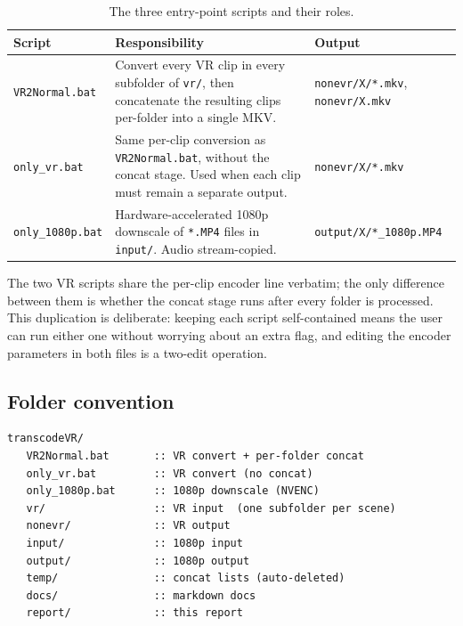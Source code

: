 \documentclass[11pt,a4paper]{article}
\begin{document}
\begin{table}[h]
\centering
\renewcommand{\arraystretch}{1.25}
\begin{tabularx}{\linewidth}{lXl}
\toprule
\textbf{Script} & \textbf{Responsibility} & \textbf{Output} \\
\midrule
\texttt{VR2Normal.bat} & Convert every VR clip in every subfolder of
\texttt{vr/}, then concatenate the resulting clips per-folder into a
single MKV. & \texttt{nonevr/X/*.mkv}, \texttt{nonevr/X.mkv} \\
\texttt{only\_vr.bat} & Same per-clip conversion as
\texttt{VR2Normal.bat}, without the concat stage. Used when each clip
must remain a separate output. & \texttt{nonevr/X/*.mkv} \\
\texttt{only\_1080p.bat} & Hardware-accelerated 1080p downscale of
\texttt{*.MP4} files in \texttt{input/}. Audio stream-copied. &
\texttt{output/X/*\_1080p.MP4} \\
\bottomrule
\end{tabularx}
\caption{The three entry-point scripts and their roles.}
\end{table}

The two VR scripts share the per-clip encoder line verbatim; the only
difference between them is whether the concat stage runs after every
folder is processed. This duplication is deliberate: keeping each
script self-contained means the user can run either one without
worrying about an extra flag, and editing the encoder parameters in
both files is a two-edit operation.

\subsection{Folder convention}

\begin{lstlisting}[language=batch, caption={Project layout. Empty
content directories ship with the repository as conventions; only
\texttt{*.bat}, \texttt{LICENSE}, \texttt{README.md}, and the
\texttt{docs/} tree are tracked in git.}]
transcodeVR/
   VR2Normal.bat       :: VR convert + per-folder concat
   only_vr.bat         :: VR convert (no concat)
   only_1080p.bat      :: 1080p downscale (NVENC)
   vr/                 :: VR input  (one subfolder per scene)
   nonevr/             :: VR output
   input/              :: 1080p input
   output/             :: 1080p output
   temp/               :: concat lists (auto-deleted)
   docs/               :: markdown docs
   report/             :: this report
\end{lstlisting}
\end{document}
